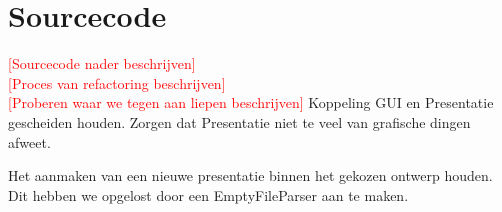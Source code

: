 \documentclass[a4paper]{article}
\newcommand{\todo}[1]{\textcolor{red}{[#1]}}
\newcommand{\1}[0]{\'{e}\'{e}n}
\begin{document}
\section{Sourcecode}
\label{sec:source}
\todo{Sourcecode nader beschrijven}
\\
\todo{Proces van refactoring beschrijven}
\\
\todo{Proberen waar we tegen aan liepen beschrijven}
Koppeling GUI en Presentatie gescheiden houden. Zorgen dat Presentatie niet te
veel van grafische dingen afweet.

Het aanmaken van een nieuwe presentatie binnen het gekozen ontwerp houden.
Dit hebben we opgelost door een EmptyFileParser aan te maken.
\end{document}
